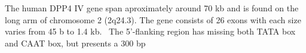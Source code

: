The human DPP4 IV gene span aproximately around 70 kb and is found on the long arm of chromosome 2 (2q24.3). The gene consists of 26 exons with each size varies from 45 b to 1.4 kb.~\cite{Abbott1994} The 5'-flanking region has missing both TATA box and CAAT box, but presents a 300 bp 